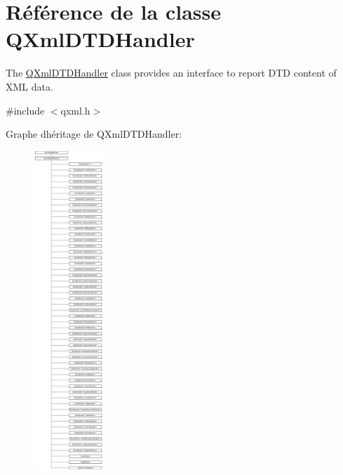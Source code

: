 \hypertarget{class_q_xml_d_t_d_handler}{}\section{Référence de la classe Q\+Xml\+D\+T\+D\+Handler}
\label{class_q_xml_d_t_d_handler}


The \hyperlink{class_q_xml_d_t_d_handler}{Q\+Xml\+D\+T\+D\+Handler} class provides an interface to report D\+T\+D content of X\+M\+L data.  




{\ttfamily \#include $<$qxml.\+h$>$}

Graphe d\textquotesingle{}héritage de Q\+Xml\+D\+T\+D\+Handler\+:\begin{figure}[H]
\begin{center}
\leavevmode
\includegraphics[height=12.000000cm]{class_q_xml_d_t_d_handler}
\end{center}
\end{figure}
